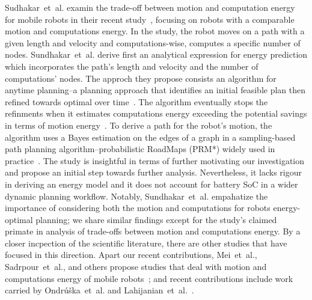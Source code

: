 Sudhakar~et~al. examin the trade-off between motion and computation energy for mobile robots in their recent study~\citep{sudhakar2020balancing}, focusing on robots with a comparable motion and computations energy. In the study, the robot moves on a path with a given length and velocity and computations-wise, computes a specific number of nodes. Sundhakar~et~al. derive first an analytical expression for energy prediction which incorporates the path's length and velocity and the number of computations' nodes. The approch they propose consists an algorithm for anytime planning--a planning approach that identifies an initial feasible plan then refined towards optimal over time~\citep{karaman2011anytime}. The algorithm eventually stops the refinments when it estimates computations energy exceeding the potential savings in terms of motion energy~\citep{sudhakar2020balancing}. To derive a path for the robot's motion, the algorithm uses a Bayes estimation on the edges of a graph in a sampling-based path planning algorithm--probabilistic RoadMaps (PRM*) widely used in practice~\citep{lavalle2006planning,karaman2011sampling}. The study is insightful in terms of further motivating our investigation and propose an initial step towards further analysis. Nevertheless, it lacks rigour in deriving an energy model and it does not account for battery SoC in a wider dynamic planning workflow. Notably, Sundhakar~et~al. empahatize the importance of considering both the motion and computations for robots energy-optimal planning; we share similar findings except for the study's claimed primate in analysis of trade-offs between motion and computations energy. By a closer incpection of the scientific literature, there are other studies that have focused in this direction. Apart our recent contributions, Mei~et~al., Sadrpour~et~al., and others propose studies that deal with motion and computations energy of mobile robots~\citep{mei2005case,mei2006deployment,brateman2006energy,zhang2007,lowsadrpour2013experimental,sadrpour2013mission}; and recent contributions include work carried by Ondr\'{u}\v{s}ka~et~al. and Lahijanian~et~al.~\citep{ondruska2015scheduled,lahijanian2018resource}.  %

